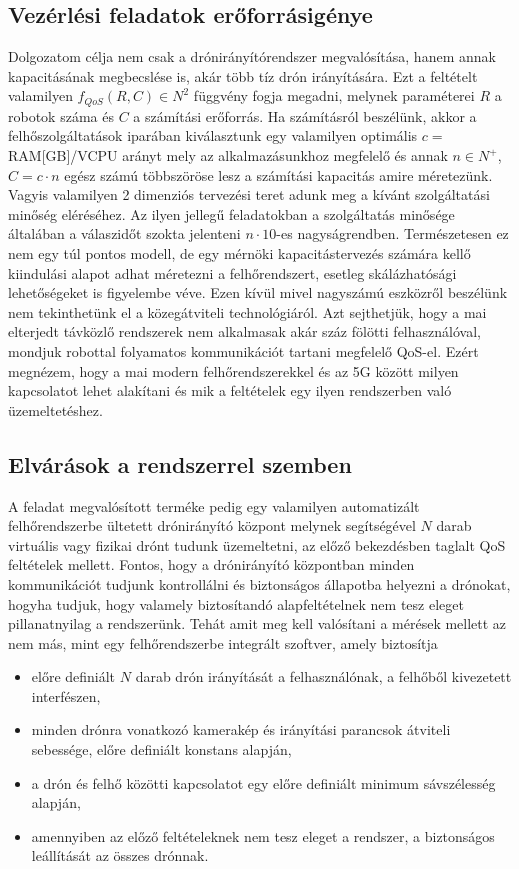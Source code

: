\subsection{Vezérlési feladatok erőforrásigénye}
\noindent
Dolgozatom célja nem csak a drónirányítórendszer megvalósítása, hanem annak kapacitásának megbecslése is, akár  több tíz drón irányítására. Ezt a feltételt valamilyen $f_{QoS}(R,C)\in N^2$ függvény fogja megadni, melynek paraméterei $R$ a robotok száma és $C$ a számítási erőforrás. Ha számításról beszélünk, akkor a felhőszolgáltatások iparában kiválasztunk egy valamilyen optimális $c=$RAM[GB]/VCPU arányt mely az alkalmazásunkhoz megfelelő és annak $n\in N^+$, $C=c\cdot n$ egész számú többszöröse lesz a számítási kapacitás amire méretezünk. Vagyis valamilyen 2 dimenziós tervezési teret adunk meg a kívánt szolgáltatási minőség eléréséhez. Az ilyen jellegű feladatokban a szolgáltatás minősége általában a válaszidőt szokta jelenteni $n \cdot 10$-es nagyságrendben. Természetesen ez nem egy túl pontos modell, de egy mérnöki kapacitástervezés számára kellő kiindulási alapot adhat méretezni a felhőrendszert, esetleg skálázhatósági lehetőségeket is figyelembe véve.
Ezen kívül mivel nagyszámú eszközről beszélünk nem tekinthetünk el a közegátviteli technológiáról. Azt sejthetjük, hogy a mai elterjedt távközlő rendszerek nem alkalmasak akár száz fölötti felhasználóval, mondjuk robottal folyamatos kommunikációt tartani megfelelő QoS-el. Ezért megnézem, hogy a mai modern felhőrendszerekkel és az 5G között milyen kapcsolatot lehet alakítani és mik a feltételek egy ilyen rendszerben való üzemeltetéshez. \\

\subsection{Elvárások a rendszerrel szemben}
\noindent
A feladat megvalósított terméke pedig egy valamilyen automatizált felhőrendszerbe ültetett drónirányító központ melynek segítségével $N$ darab virtuális vagy fizikai drónt tudunk üzemeltetni, az előző bekezdésben taglalt QoS feltételek mellett. Fontos, hogy a drónirányító központban minden kommunikációt tudjunk kontrollálni és biztonságos állapotba helyezni a drónokat, hogyha tudjuk, hogy valamely biztosítandó alapfeltételnek nem tesz eleget pillanatnyilag a rendszerünk. Tehát amit meg kell valósítani a mérések mellett az nem más, mint egy felhőrendszerbe integrált szoftver, amely biztosítja 
\begin{itemize}
	\item előre definiált $N$ darab drón irányítását a felhasználónak, a felhőből kivezetett interfészen,
	\item minden drónra vonatkozó kamerakép és irányítási parancsok átviteli sebessége, előre definiált konstans alapján,
	\item a drón és felhő közötti kapcsolatot egy előre definiált minimum sávszélesség alapján,
	\item amennyiben az előző feltételeknek nem tesz eleget a rendszer, a biztonságos leállítását az összes drónnak.
\end{itemize}


